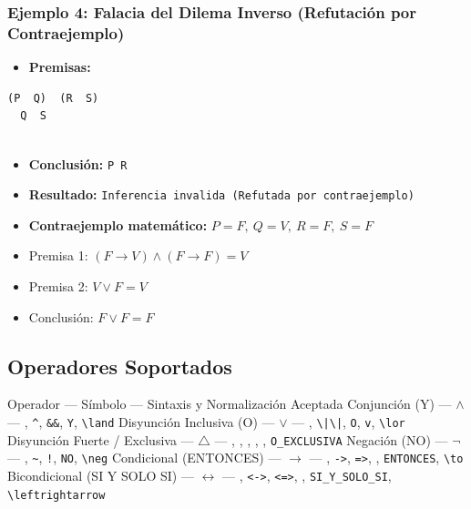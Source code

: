 \documentclass[11pt,a4paper,openany]{book}
\begin{document}
\subsubsection{Ejemplo 4: Falacia del Dilema Inverso (Refutación por Contraejemplo)}
\begin{itemize}[leftmargin=*]
\item \textbf{Premisas:}
\end{itemize}
\begin{lstlisting}[language={},basicstyle=\ttfamily\scriptsize]
  (P  Q)  (R  S)
  Q  S
  
\end{lstlisting}
\begin{itemize}[leftmargin=*]
\item \textbf{Conclusión:} \texttt{P  R}
\item \textbf{Resultado:} \texttt{Inferencia invalida (Refutada por contraejemplo)}
\item \textbf{Contraejemplo matemático:} $P = F, \ Q = V, \ R = F, \ S = F$
\item Premisa 1: $(F \to V) \land (F \to F) = V$
\item Premisa 2: $V \lor F = V$
\item Conclusión: $F \lor F = F$
\end{itemize}

\hrulefill

\subsection{Operadores Soportados}

Operador --- Símbolo --- Sintaxis y Normalización Aceptada
Conjunción (Y) --- $\wedge$ --- \texttt{}, \texttt{\textasciicircum{}}, \texttt{\&\&}, \texttt{Y}, \texttt{\textbackslash{}land}
Disyunción Inclusiva (O) --- $\vee$ --- \texttt{}, \texttt{\textbackslash{}|\textbackslash{}|}, \texttt{O}, \texttt{v}, \texttt{\textbackslash{}lor}
Disyunción Fuerte / Exclusiva --- $\triangle$ --- \texttt{}, \texttt{}, \texttt{}, \texttt{}, \texttt{}, \texttt{O\_EXCLUSIVA}
Negación (NO) --- $\neg$ --- \texttt{}, \texttt{\textasciitilde{}}, \texttt{!}, \texttt{NO}, \texttt{\textbackslash{}neg}
Condicional (ENTONCES) --- $\rightarrow$ --- \texttt{}, \texttt{->}, \texttt{=>}, \texttt{}, \texttt{ENTONCES}, \texttt{\textbackslash{}to}
Bicondicional (SI Y SOLO SI) --- $\leftrightarrow$ --- \texttt{}, \texttt{<->}, \texttt{<=>}, \texttt{}, \texttt{SI\_Y\_SOLO\_SI}, \texttt{\textbackslash{}leftrightarrow}
\end{document}
